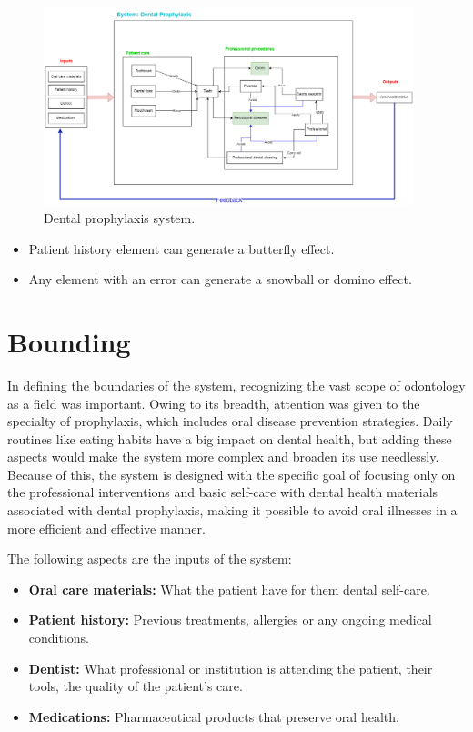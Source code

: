 \documentclass[12pt]{article}
\begin{document}
\begin{figure}[htbp]
\centerline{\includegraphics[width=0.96\textwidth]{figures/fig1.png}}
\caption{Dental prophylaxis system.}
\label{fig:system}
\end{figure}

\begin{itemize}
    \item Patient history element can generate a butterfly effect.
    \item Any element with an error can generate a snowball or domino effect.
\end{itemize}

\section*{Bounding}
In defining the boundaries of the system, recognizing the vast scope of odontology as a field was important. Owing to its breadth, attention was given to the specialty of prophylaxis, which includes oral disease prevention strategies. Daily routines like eating habits have a big impact on dental health, but adding these aspects would make the system more complex and broaden its use needlessly. Because of this, the system is designed with the specific goal of focusing only on the professional interventions and basic self-care with dental health materials associated with dental prophylaxis, making it possible to avoid oral illnesses in a more efficient and effective manner.

The following aspects are the inputs of the system:

\begin{itemize}
    \item \textbf{Oral care materials: }What the patient have for them dental self-care.
    \item \textbf{Patient history: }Previous treatments, allergies or any ongoing medical conditions.
    \item \textbf{Dentist: }What professional or institution is attending the patient, their tools, the quality of the patient's care.
    \item \textbf{Medications: }Pharmaceutical products that preserve oral health.
\end{itemize}
\end{document}

